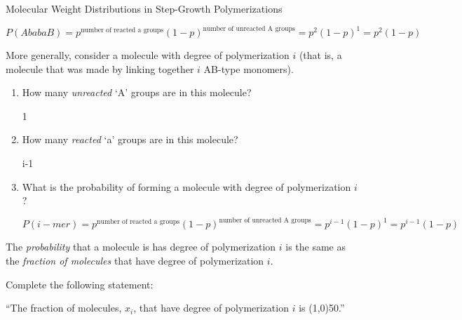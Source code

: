 \begin{activity}{Molecular Weight Distributions in Step-Growth Polymerizations}
\begin{ctqs}
\begin{enumerate}
				\begin{solution}[0.5in]
					$P(AbabaB) = p^\text{number of reacted a groups}(1-p)^\text{number of unreacted A groups} = p^2(1-p)^1 = p^2(1-p)$
				\end{solution}
				
		\end{enumerate}
		
	\question More generally, consider a molecule with degree of polymerization $i$ (that is, a molecule that was made by linking together $i$ AB-type monomers).
	
		\begin{enumerate}
		
			\item How many \emph{unreacted} `A' groups are in this molecule?
			
				\begin{solution}[0.5in]
					1
				\end{solution}
				
			\item How many \emph{reacted} `a' groups are in this molecule?
			
				\begin{solution}[0.5in]
					i-1
				\end{solution}
				
			\item What is the probability of forming a molecule with degree of polymerization $i$?
			
				\begin{solution}[1in]
					$P(i-mer) = p^\text{number of reacted a groups}(1-p)^\text{number of unreacted A groups} = p^{i-1}(1-p)^1 = p^{i-1}(1-p)$
				\end{solution}
			
		\end{enumerate}
		
\end{ctqs}

\begin{infobox}
	The \emph{probability} that a molecule is has degree of polymerization $i$ is the same as the \emph{fraction of molecules} that have degree of polymerization $i$.
\end{infobox}


\begin{ctqs}
	
	\question Complete the following statement:
	
		``The fraction of molecules, $x_i$, that have degree of polymerization $i$ is \line(1,0){50}.''
	

\end{ctqs}
\end{activity}

